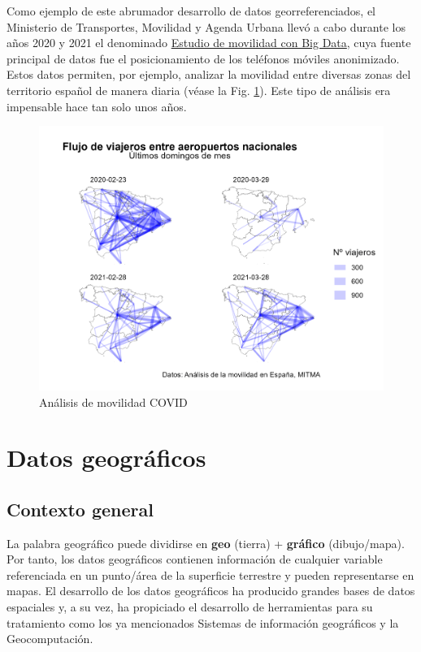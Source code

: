 \documentclass[
]{book}
\theoremstyle{definition}
\theoremstyle{definition}
\theoremstyle{definition}
\theoremstyle{definition}
\theoremstyle{remark}
\begin{document}
Como ejemplo de este abrumador desarrollo de datos georreferenciados, el
Ministerio de Transportes, Movilidad y Agenda Urbana llevó a cabo durante los
años 2020 y 2021 el denominado \href{https://www.mitma.gob.es/ministerio/covid-19/evolucion-movilidad-big-data}{Estudio de movilidad con Big
Data},
cuya fuente principal de datos fue el posicionamiento de los teléfonos móviles
anonimizado. Estos datos permiten, por ejemplo, analizar la movilidad entre
diversas zonas del territorio español de manera diaria (véase la Fig.
\ref{fig:mov}). Este tipo de análisis era impensable hace tan solo unos años.

\begin{figure}

{\centering \includegraphics[width=0.6\linewidth]{img/movilidad_covid} 

}

\caption{Análisis de movilidad COVID}\label{fig:mov}
\end{figure}

\hypertarget{datos-geogruxe1ficos}{%
\chapter{Datos geográficos}\label{datos-geogruxe1ficos}}

\hypertarget{contexto-general}{%
\section{Contexto general}\label{contexto-general}}

La palabra geográfico puede dividirse en \textbf{geo} (tierra) + \textbf{gráfico}
(dibujo/mapa). Por tanto, los datos geográficos contienen información de
cualquier variable referenciada en un punto/área de la superficie terrestre y
pueden representarse en mapas. El desarrollo de los datos geográficos ha
producido grandes bases de datos espaciales y, a su vez, ha propiciado el
desarrollo de herramientas para su tratamiento como los ya mencionados Sistemas
de información geográficos y la Geocomputación.
\end{document}
